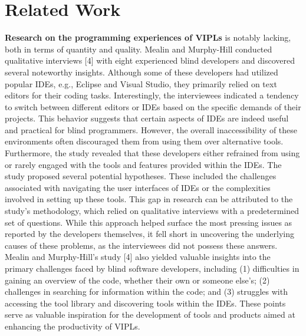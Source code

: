 \section{Related Work}
\label{sec:related}

{\bf Research on the programming experiences of VIPLs} is notably
lacking, both in terms of quantity and quality. Mealin and Murphy-Hill
conducted qualitative interviews [4] with eight experienced blind
developers and discovered several noteworthy insights. Although some
of these developers had utilized popular IDEs, e.g., Eclipse and
Visual Studio, they primarily relied on text editors for their coding
tasks. Interestingly, the interviewees indicated a tendency to switch
between different editors or IDEs based on the specific demands of
their projects. This behavior suggests that certain aspects of IDEs
are indeed useful and practical for blind programmers. However, the
overall inaccessibility of these environments often discouraged them
from using them over alternative tools.
Furthermore, the study revealed that these developers either refrained
from using or rarely engaged with the tools and features provided
within the IDEs.
The study proposed several potential hypotheses. These included the
challenges associated with navigating the user interfaces of IDEs or
the complexities involved in setting up these tools. This gap in
research can be attributed to the study's methodology, which relied on
qualitative interviews with a predetermined set of questions. While
this approach helped surface the most pressing issues as reported by
the developers themselves, it fell short in uncovering the underlying
causes of these problems, as the interviewees did not possess these
answers.
Mealin and Murphy-Hill's study [4] also yielded valuable insights into
the primary challenges faced by blind software developers, including
(1) difficulties in gaining an overview of the code, whether their own
or someone else's; (2) challenges in searching for information within
the code; and (3) struggles with accessing the tool library and
discovering tools within the IDEs. These points serve as valuable
inspiration for the development of tools and products aimed at
enhancing the productivity of VIPLs.

